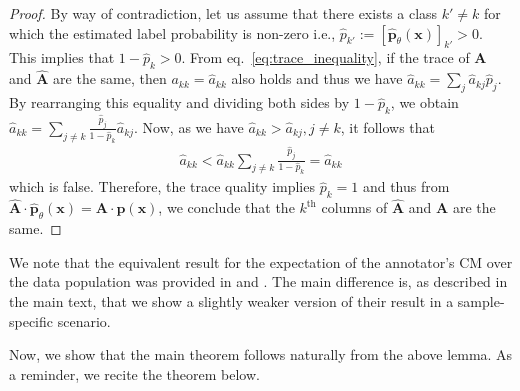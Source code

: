 \begin{proof}
By way of contradiction, let us assume that there exists a class $k' \neq k$ for which the estimated label probability is non-zero i.e., $\hat{p}_{k'}:=[\hat{\textbf{p}}_\theta(\textbf{x})]_{k'} > 0$. This implies that $1 - \hat{p}_{k} > 0 $.  From eq.~\eqref{eq:trace_inequality}, if the trace of $\textbf{A}$ and $\hat{\textbf{A}}$ are the same, then $ a_{kk} = \hat{a}_{kk}$ also holds and thus we have $ \hat{a}_{kk} = \sum_{j}  \hat{a}_{kj}\hat{p}_{j} $. By rearranging this equality and dividing both sides by $1 - \hat{p}_{k}$, we obtain $\hat{a}_{kk} = \sum_{j\neq k} \frac{\hat{p}_{j}}{1 - \hat{p}_{k}}\hat{a}_{kj}$. Now, as we have $\hat{a}_{kk} > \hat{a}_{kj}, j\neq k$, it follows that
\begin{align*}
    \hat{a}_{kk} < \hat{a}_{kk} \sum_{j\neq k} \frac{\hat{p}_{j}}{1 - \hat{p}_{k}} = \hat{a}_{kk}
\end{align*}
which is false. Therefore, the trace quality implies $\hat{p}_{k} = 1$ and thus from $\hat{\textbf{A}}\cdot \hat{\textbf{p}}_\theta(\textbf{x})=\textbf{A}\cdot \textbf{p}(\textbf{x})$, we conclude that the $k^{\text{th}}$ columns of $\hat{\textbf{A}}$ and $\textbf{A}$ are the same. 

\end{proof}


We note that the equivalent result for the expectation of the annotator's CM over the data population was provided in \cite{sukhbaatar2014training} and \cite{tanno2019learning}. The main difference is, as described in the main text, that we show a slightly weaker version of their result in a sample-specific scenario. 

Now, we show that the main theorem follows naturally from the above lemma. As a reminder, we recite the theorem below. 


\newpage

